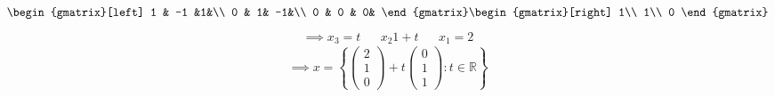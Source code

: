 \begin{enumerate}
\begin{equation}
\begin{gmatrix}[left]
1 & -1 &1&\\
0 & 1& -1&\\
0 & 0 & 0&
\end{gmatrix}
\begin{gmatrix}[right]
1\\
1\\
0
\end{gmatrix}
\end{equation}
\begin{align}
\implies x_3 =t && x_2 1 + t && x_1 =2
\end{align}
\begin{equation}
\implies x = \left\{\begin{pmatrix}2\\1\\0\end{pmatrix} +
  t \begin{pmatrix}0\\1\\1\end{pmatrix}\colon t \in \mathbb{R}\right\}
\end{equation}
\end{enumerate}
